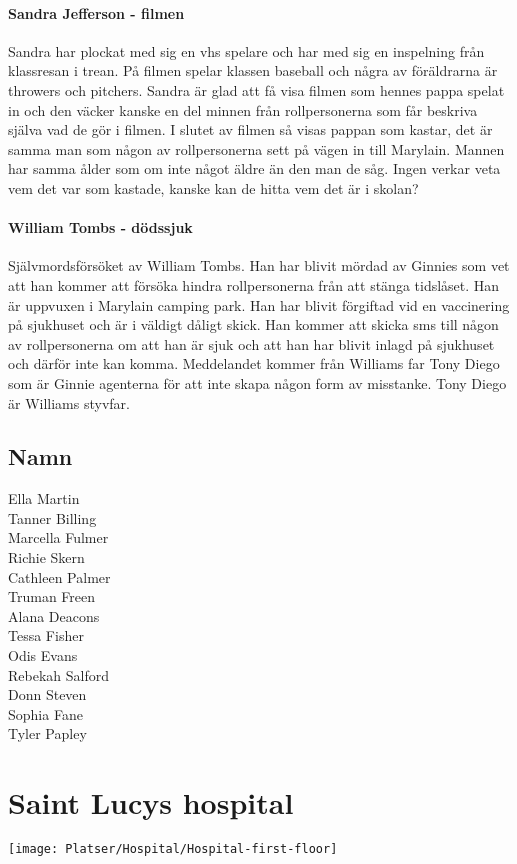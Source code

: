\documentclass[a5paper,10pt]{report}
\begin{document}
\paragraph{Sandra Jefferson - filmen}
Sandra har plockat med sig en vhs spelare och har med sig en inspelning från klassresan i trean. På filmen spelar klassen baseball och några av föräldrarna är throwers och pitchers. Sandra är glad att få visa filmen som hennes pappa spelat in och den väcker kanske en del minnen från rollpersonerna som får beskriva själva vad de gör i filmen. I slutet av filmen så visas pappan som kastar, det är samma man som någon av rollpersonerna sett på vägen in till Marylain. Mannen har samma ålder som om inte något äldre än den man de såg. Ingen verkar veta vem det var som kastade, kanske kan de hitta vem det är i skolan?
\paragraph{William Tombs - dödssjuk}
Självmordsförsöket av William Tombs. Han har blivit mördad av Ginnies som vet att han kommer att försöka hindra rollpersonerna från att stänga tidslåset. Han är uppvuxen i Marylain camping park. Han har blivit förgiftad vid en vaccinering på sjukhuset och är i väldigt dåligt skick. Han kommer att skicka sms till någon av rollpersonerna om att han är sjuk och att han har blivit inlagd på sjukhuset och därför inte kan komma. Meddelandet kommer från Williams far Tony Diego som är Ginnie agenterna för att inte skapa någon form av misstanke. Tony Diego är Williams styvfar.
\subsection{Namn}
Ella Martin\\
Tanner Billing\\
Marcella Fulmer\\
Richie Skern\\
Cathleen Palmer\\
Truman Freen\\
Alana Deacons\\
Tessa Fisher\\
Odis Evans\\
Rebekah Salford\\
Donn Steven\\
Sophia Fane\\
Tyler Papley
\section{Saint Lucys hospital}
\texttt{[image: Platser/Hospital/Hospital-first-floor]}
\end{document}
